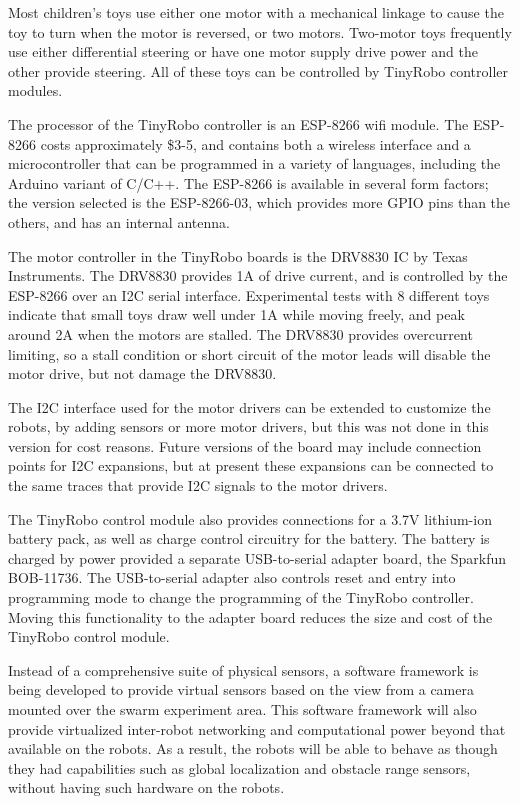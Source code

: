 \documentclass[letterpaper, 10 pt, conference]{ieeeconf}  %
\begin{document}
Most children's toys use either one motor with a mechanical linkage to cause the toy to turn when the motor is reversed, or two motors.
Two-motor toys frequently use either differential steering or have one motor supply drive power and the other provide steering. 
All of these toys can be controlled by TinyRobo controller modules.

The processor of the TinyRobo controller is an ESP-8266 wifi module.
The ESP-8266 costs approximately \$3-5, and contains both a wireless interface and a microcontroller that can be programmed in a variety of languages, including the Arduino variant of C/C++.   
The ESP-8266 is available in several form factors; the version selected is the ESP-8266-03, which provides more GPIO pins than the others, and has an internal antenna.

The motor controller in the TinyRobo boards is the DRV8830 IC by Texas Instruments. 
The DRV8830 provides 1A of drive current, and is controlled by the ESP-8266 over an I2C serial interface. 
Experimental tests with 8 different toys indicate that small toys draw well under 1A while moving freely, and peak around 2A when the motors are stalled. 
The DRV8830 provides overcurrent limiting, so a stall condition or short circuit of the motor leads will disable the motor drive, but not damage the DRV8830. 

The I2C interface used for the motor drivers can be extended to customize the robots, by adding sensors or more motor drivers, but this was not done in this version for cost reasons. 
Future versions of the board may include connection points for I2C expansions, but at present these expansions can be connected to the same traces that provide I2C signals to the motor drivers. 

The TinyRobo control module also provides connections for a 3.7V lithium-ion battery pack, as well as charge control circuitry for the battery. 
The battery is charged by power provided a separate USB-to-serial adapter board, the Sparkfun BOB-11736. 
The USB-to-serial adapter also controls reset and entry into programming mode to change the programming of the TinyRobo controller. 
Moving this functionality to the adapter board reduces the size and cost of the TinyRobo control module. 

Instead of a comprehensive suite of physical sensors, a software framework is being developed to provide virtual sensors based on the view from a camera mounted over the swarm experiment area.
This software framework will also provide virtualized inter-robot networking and computational power beyond that available on the robots. 
As a result, the robots will be able to behave as though they had capabilities such as global localization and obstacle range sensors, without having such hardware on the robots.
\end{document}
